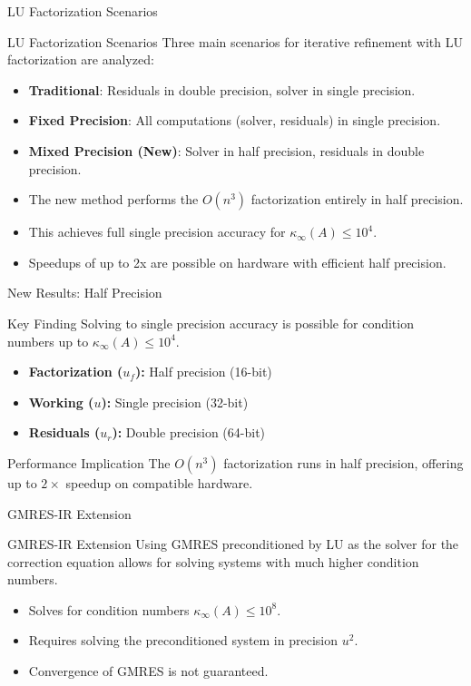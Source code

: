 \documentclass[
	11pt,
	aspectratio=169,
]{beamer}
\begin{document}
\begin{frame}{LU Factorization Scenarios}
    \begin{block}{LU Factorization Scenarios}
Three main scenarios for iterative refinement with LU factorization are analyzed:
\begin{itemize}
    \item \textbf{Traditional}: Residuals in double precision, solver in single precision.
    \item \textbf{Fixed Precision}: All computations (solver, residuals) in single precision.
    \item \textbf{Mixed Precision (New)}: Solver in half precision, residuals in double precision.
\end{itemize}
\end{block}

\begin{itemize}
    \item The new method performs the $O(n^3)$ factorization entirely in half precision.
    \item This achieves full single precision accuracy for $\kappa_{\infty}(A) \leq 10^4$.
    \item Speedups of up to 2x are possible on hardware with efficient half precision.
\end{itemize}
\end{frame}
\begin{frame}{New Results: Half Precision}
    \begin{alertblock}{Key Finding}
Solving to single precision accuracy is possible for condition numbers up to $\kappa_{\infty}(A) \leq 10^4$.
\end{alertblock}

\begin{itemize}
    \item \textbf{Factorization ($u_f$):} Half precision (16-bit)
    \item \textbf{Working ($u$):} Single precision (32-bit)
    \item \textbf{Residuals ($u_r$):} Double precision (64-bit)
\end{itemize}

\begin{block}{Performance Implication}
The $O(n^3)$ factorization runs in half precision, offering up to $2\times$ speedup on compatible hardware.
\end{block}
\end{frame}
\begin{frame}{GMRES-IR Extension}
    \begin{block}{GMRES-IR Extension}
Using GMRES preconditioned by LU as the solver for the correction equation allows for solving systems with much higher condition numbers.
\end{block}

\begin{itemize}
    \item Solves for condition numbers $\kappa_{\infty}(A) \leq 10^8$.
    \item Requires solving the preconditioned system in precision $u^2$.
    \item Convergence of GMRES is not guaranteed.
\end{itemize}
\end{frame}
\end{document}
